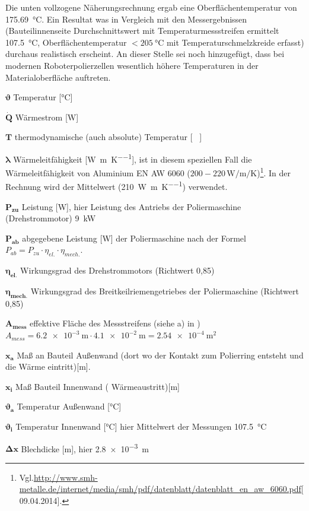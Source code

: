 \documentclass[12pt,a4paper,parskip,twoside,BCOR5mm,headsepline]{scrartcl}
\begin{document}
Die unten vollzogene Näherungsrechnung ergab eine Oberflächentemperatur von \SI{175.69}{\degreeCelsius}. Ein Resultat was in Vergleich mit den Messergebnissen (Bauteilinnenseite Durchschnittswert mit Temperaturmessstreifen ermittelt \SI{107.5}{\degreeCelsius}, Oberflächentemperatur $< \SI{205}{\degreeCelsius}$ mit Temperaturschmelzkreide erfasst) durchaus realistisch erscheint.
An dieser Stelle sei noch hinzugefügt, dass  bei modernen Roboterpolierzellen wesentlich höhere Temperaturen in der Materialoberfläche auftreten.



\newpage
\begin{description*}
\item[ $\boldsymbol{\vartheta }$] Temperatur  [\si{\degreeCelsius}]
\item[$ \boldsymbol{\dot{Q}} $ ] Wärmestrom [\si{\watt}]
\item[$\boldsymbol{ \si{T}}$] thermodynamische (auch absolute) Temperatur [\si{\kelvin
}]
\item[$\boldsymbol{\lambda} $] Wärmeleitfähigkeit [\si{\watt\per\metre\per\kelvin}], ist in diesem speziellen Fall die Wärmeleitfähigkeit von Aluminium EN AW 6060 ($200-220 \, \si{\watt\per\meter\per\kelvin}$)\footnote{Vgl.\url{http://www.smh-metalle.de/internet/media/smh/pdf/datenblatt/datenblatt_en_aw_6060.pdf}[09.04.2014].}. In der Rechnung wird der Mittelwert (\SI{210}{\watt\per\meter\per\kelvin}) verwendet.
\item[$\boldsymbol{ P_{zu}} $] Leistung [\si{\watt}], hier Leistung des Antriebs der Poliermaschine (Drehstrommotor)  \SI{9}{\kilo\watt}
\item[$\boldsymbol{P_{ab}} $]  abgegebene Leistung [\si{\watt}] der Poliermaschine nach der Formel $ P_{ab} = P_{zu} \cdot \eta_{el.} \cdot \eta_{mech.}$.\autocite[R2]{g}
\item[$\boldsymbol{\eta_{el.} }$] Wirkungsgrad des Drehstrommotors (Richtwert 0,85)\autocite[40]{tm}
\item[$\boldsymbol{\eta_{mech.}} $]Wirkungsgrad des Breitkeilriemengetriebes der Poliermaschine (Richtwert 0,85)\autocite[40]{tm}
\item[$\boldsymbol{A_{mess}} $] effektive Fläche des Messstreifens (siehe  a) in ) $ A_{mess} = \SI{6.2e-3}{\meter} \cdot \SI{4.1e-2}{\meter} = \SI{2.54e-4}{\meter\squared}$
\item[$\boldsymbol{x_a }$]  Maß an Bauteil Außenwand (dort wo der Kontakt zum Polierring entsteht und die Wärme eintritt)[\si{\meter}]. 
\item[$\boldsymbol{x_i}$] Maß Bauteil Innenwand ( Wärmeaustritt)[\si{\meter}]
\item[$\boldsymbol{\vartheta_a}$] Temperatur Außenwand [\si{\degreeCelsius}] 
\item[$\boldsymbol{\vartheta_i}$] Temperatur Innenwand [\si{\degreeCelsius}] hier Mittelwert der Messungen \SI{107.5}{\degreeCelsius} 
\item[$\boldsymbol{ \Delta x }$] Blechdicke [\si{\meter}], hier \SI{2.8e-3}{\meter}


\end{description*}
\end{document}

